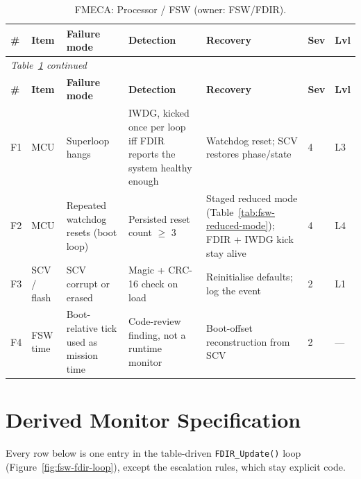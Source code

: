 \small
\begin{longtable}{p{0.5cm}p{1.3cm}p{2.3cm}p{3.1cm}p{3.0cm}p{0.5cm}p{0.5cm}}
\caption{FMECA: Processor / FSW (owner: FSW/FDIR).}
\label{tab:fsw-fmeca-processor}\\
\toprule
\textbf{\#} & \textbf{Item} & \textbf{Failure mode} & \textbf{Detection} & \textbf{Recovery} & \textbf{Sev} & \textbf{Lvl} \\
\midrule
\endfirsthead
\multicolumn{7}{l}{\small\itshape Table~\ref{tab:fsw-fmeca-processor} continued}\\
\toprule
\textbf{\#} & \textbf{Item} & \textbf{Failure mode} & \textbf{Detection} & \textbf{Recovery} & \textbf{Sev} & \textbf{Lvl} \\
\midrule
\endhead
F1 & MCU & Superloop hangs & IWDG, kicked once per loop iff FDIR reports the system healthy enough & Watchdog reset; SCV restores phase/state & 4 & L3 \\
F2 & MCU & Repeated watchdog resets (boot loop) & Persisted reset count $\geq$ 3 & Staged reduced mode (Table~\ref{tab:fsw-reduced-mode}); FDIR + IWDG kick stay alive & 4 & L4 \\
F3 & SCV / flash & SCV corrupt or erased & Magic + CRC-16 check on load & Reinitialise defaults; log the event & 2 & L1 \\
F4 & FSW time & Boot-relative tick used as mission time & Code-review finding, not a runtime monitor & Boot-offset reconstruction from SCV & 2 & --- \\
\bottomrule
\end{longtable}

\section{Derived Monitor Specification}

Every row below is one entry in the table-driven \texttt{FDIR\_Update()}
loop (Figure~\ref{fig:fsw-fdir-loop}), except the escalation rules, which
stay explicit code.


